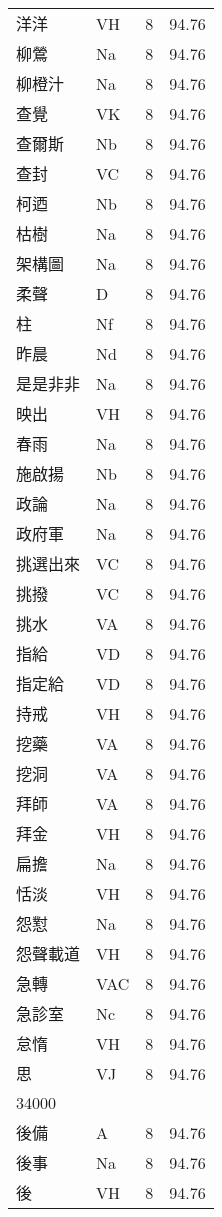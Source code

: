 \documentclass[twocolumn]{book}
\begin{document}
\begin{supertabular}{llrr}
洋洋 & VH & 8 &  94.76\\
柳鶯 & Na & 8 &  94.76\\
柳橙汁 & Na & 8 &  94.76\\
查覺 & VK & 8 &  94.76\\
查爾斯 & Nb & 8 &  94.76\\
查封 & VC & 8 &  94.76\\
柯迺 & Nb & 8 &  94.76\\
枯樹 & Na & 8 &  94.76\\
架構圖 & Na & 8 &  94.76\\
柔聲 & D & 8 &  94.76\\
柱 & Nf & 8 &  94.76\\
昨晨 & Nd & 8 &  94.76\\
是是非非 & Na & 8 &  94.76\\
映出 & VH & 8 &  94.76\\
春雨 & Na & 8 &  94.76\\
施啟揚 & Nb & 8 &  94.76\\
政論 & Na & 8 &  94.76\\
政府軍 & Na & 8 &  94.76\\
挑選出來 & VC & 8 &  94.76\\
挑撥 & VC & 8 &  94.76\\
挑水 & VA & 8 &  94.76\\
指給 & VD & 8 &  94.76\\
指定給 & VD & 8 &  94.76\\
持戒 & VH & 8 &  94.76\\
挖藥 & VA & 8 &  94.76\\
挖洞 & VA & 8 &  94.76\\
拜師 & VA & 8 &  94.76\\
拜金 & VH & 8 &  94.76\\
扁擔 & Na & 8 &  94.76\\
恬淡 & VH & 8 &  94.76\\
怨懟 & Na & 8 &  94.76\\
怨聲載道 & VH & 8 &  94.76\\
急轉 & VAC & 8 &  94.76\\
急診室 & Nc & 8 &  94.76\\
怠惰 & VH & 8 &  94.76\\
思 & VJ & 8 &  94.76\\
34000\\
後備 & A & 8 &  94.76\\
後事 & Na & 8 &  94.76\\
後 & VH & 8 &  94.76\\

\end{supertabular}
\end{document}
